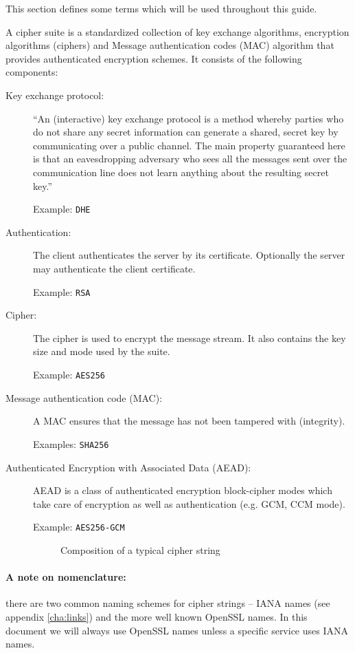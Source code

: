 
This section defines some terms which will be used throughout this guide.


A cipher suite is a standardized collection of key exchange algorithms, encryption 
algorithms (ciphers) and Message authentication codes (MAC) algorithm that provides
authenticated encryption schemes. It consists of the following components:

\begin{description}

\item[Key exchange protocol:]
``An (interactive) key exchange protocol is a method whereby parties who do not 
share any secret information can generate a shared, secret key by communicating 
over a public channel. The main property guaranteed here is that an 
eavesdropping adversary who sees all the messages sent over the communication 
line does not learn anything about the resulting secret key.''~\cite{katz2008introduction}

Example: \texttt{DHE}

\item[Authentication:]
The client authenticates the server by its certificate. Optionally the server 
may authenticate the client certificate.

Example: \texttt{RSA}

\item[Cipher:]
The cipher is used to encrypt the message stream. It also contains the key size
and mode used by the suite.

Example: \texttt{AES256}

\item[Message authentication code (MAC):]
A MAC ensures that the message has not been tampered with (integrity).

Examples: \texttt{SHA256}

\item[Authenticated Encryption with Associated Data (AEAD):]
AEAD is a class of authenticated encryption block-cipher modes
which take care of encryption as well as authentication (e.g. GCM, CCM mode). 

Example: \texttt{AES256-GCM}



\begin{figure}[h]
\caption{Composition of a typical cipher string}
\end{figure}
\end{description}
%
\paragraph*{A note on nomenclature:} there are two common naming schemes for cipher strings -- IANA names (see appendix \ref{cha:links}) and the more well known OpenSSL names. In this document we will always use OpenSSL names unless a specific service uses IANA names.
